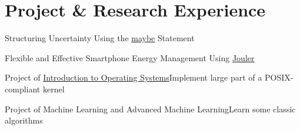 
\section{Project \& Research Experience}



{Structuring Uncertainty Using the \href{http://blue.cse.buffalo.edu/projects/maybe}{maybe} Statement}{}{}{}
{}

{Flexible and Effective Smartphone Energy Management Using \href{http://blue.cse.buffalo.edu/projects/jouler/}{Jouler}}{}{}{}
{}

{Project of \href{http://www.ops-class.org/asst/}{Introduction to Operating Systems}}{Implement large part of a POSIX-compliant kernel}{}{}
{
}

{Project of Machine Learning and Advanced Machine Learning}{Learn some classic algorithms}{}{}
{
}

